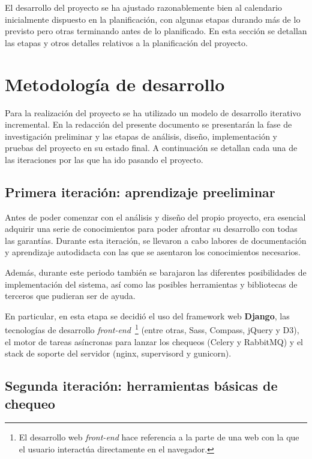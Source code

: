 El desarrollo del proyecto se ha ajustado razonablemente bien al calendario
inicialmente dispuesto en la planificación, con algunas etapas durando más de lo
previsto pero otras terminando antes de lo planificado. En esta sección se
detallan las etapas y otros detalles relativos a la planificación del proyecto.

\section{Metodología de desarrollo}

Para la realización del proyecto se ha utilizado un modelo de desarrollo
iterativo incremental. En la redacción del presente documento se presentarán la
fase de investigación preliminar y las etapas de análisis, diseño,
implementación y pruebas del proyecto en su estado final. A continuación se
detallan cada una de las iteraciones por las que ha ido pasando el proyecto.

\subsection{Primera iteración: aprendizaje preeliminar}

Antes de poder comenzar con el análisis y diseño del propio proyecto,
era esencial adquirir una serie de conocimientos para poder afrontar
su desarrollo con todas las garantías. Durante esta iteración, se
llevaron a cabo labores de documentación y aprendizaje autodidacta con
las que se asentaron los conocimientos necesarios.

Además, durante este periodo también se barajaron las diferentes
posibilidades de implementación del sistema, así como las posibles
herramientas y bibliotecas de terceros que pudieran ser de ayuda.

En particular, en esta etapa se decidió el uso del framework web
\textbf{Django}, las tecnologías de desarrollo \textit{front-end}~\footnote{El
  desarrollo web \textit{front-end} hace referencia a la parte de una web con la
  que el usuario interactúa directamente en el navegador.} (entre otras, Sass,
Compass, jQuery y D3), el motor de tareas asíncronas para lanzar los chequeos
(Celery y RabbitMQ) y el stack de soporte del servidor (nginx, supervisord y
gunicorn).

\subsection{Segunda iteración: herramientas básicas de chequeo}

